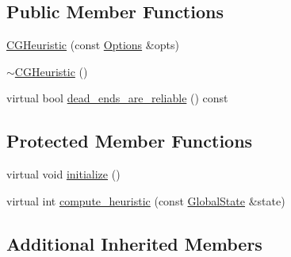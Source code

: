 \subsection*{Public Member Functions}
\begin{DoxyCompactItemize}
\item 
\hyperlink{classCGHeuristic_a1c4c671e749df50cc75cf1f5f4a36233}{C\-G\-Heuristic} (const \hyperlink{classOptions}{Options} \&opts)
\item 
\hyperlink{classCGHeuristic_a9f8a37d085038ed5388c5351adcadc42}{$\sim$\-C\-G\-Heuristic} ()
\item 
virtual bool \hyperlink{classCGHeuristic_a35e572c29eff7b1ce661fafac90c46d5}{dead\-\_\-ends\-\_\-are\-\_\-reliable} () const 
\end{DoxyCompactItemize}
\subsection*{Protected Member Functions}
\begin{DoxyCompactItemize}
\item 
virtual void \hyperlink{classCGHeuristic_a41af92f82ef6d2f57552e894cb1d50fb}{initialize} ()
\item 
virtual int \hyperlink{classCGHeuristic_ad2e02bf90acf0452245fece28aa78e97}{compute\-\_\-heuristic} (const \hyperlink{classGlobalState}{Global\-State} \&state)
\end{DoxyCompactItemize}
\subsection*{Additional Inherited Members}


